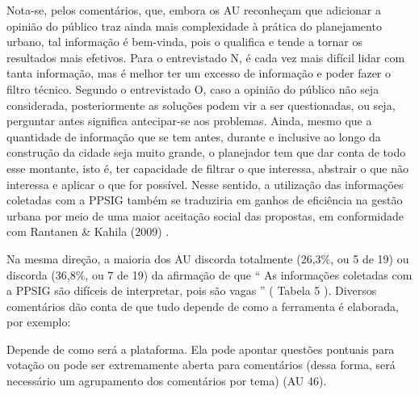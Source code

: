\documentclass{article}
\begin{document}
Nota-se, pelos comentários, que, embora os AU reconheçam que adicionar a opinião
					do público traz ainda mais complexidade à prática do planejamento urbano, tal
					informação é bem-vinda, pois o qualifica e tende a tornar os resultados mais
					efetivos. Para o entrevistado N, é cada vez mais difícil lidar com tanta
					informação, mas é melhor ter um excesso de informação e poder fazer o filtro
					técnico. Segundo o entrevistado O, caso a opinião do público não seja
					considerada, posteriormente as soluções podem vir a ser questionadas, ou seja,
					perguntar antes significa antecipar-se aos problemas. Ainda, mesmo que a
					quantidade de informação que se tem antes, durante e inclusive ao longo da
					construção da cidade seja muito grande, o planejador tem que dar conta de todo
					esse montante, isto é, ter capacidade de filtrar o que interessa, abstrair o que
					não interessa e aplicar o que for possível. Nesse sentido, a utilização das
					informações coletadas com a PPSIG também se traduziria em ganhos de eficiência
					na gestão urbana por meio de uma maior aceitação social das propostas, em
					conformidade com %
Rantanen \& Kahila
						(2009)%
.

Na mesma direção, a maioria dos AU discorda totalmente (26,3\%, ou 5 de 19) ou
					discorda (36,8\%, ou 7 de 19) da afirmação de que “%
As informações
						coletadas com a PPSIG são difíceis de interpretar, pois são vagas%
”
						(%
Tabela 5%
). Diversos comentários dão
					conta de que tudo depende de como a ferramenta é elaborada, por exemplo: 

Depende de como será a plataforma. Ela pode apontar questões pontuais para
						votação ou pode ser extremamente aberta para comentários (dessa forma, será
						necessário um agrupamento dos comentários por tema) %
(AU
							46).%

\end{document}
